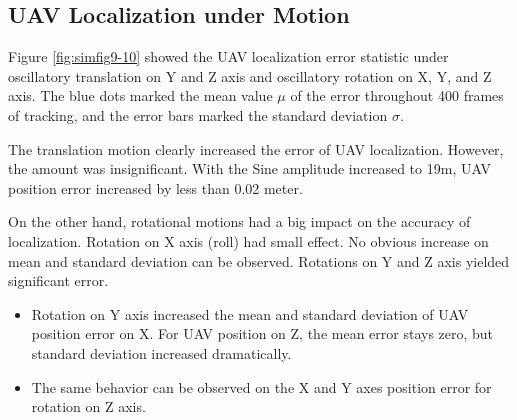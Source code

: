 \subsection{UAV Localization under Motion}\label{localization_motion}

Figure \ref{fig:simfig9-10} showed the UAV localization error
statistic under oscillatory translation on Y and Z axis and
oscillatory rotation on X, Y, and Z axis. The blue dots marked the mean
value $\mu$ of the error throughout 400 frames of tracking, and the
error bars marked the standard deviation $\sigma$.

The translation motion clearly increased the error of UAV
localization. However, the amount was insignificant. With the Sine
amplitude increased to 19m, UAV position error increased by less than
0.02 meter.

On the other hand, rotational motions had a big impact on the accuracy
of localization. Rotation on X axis (roll) had small effect. No
obvious increase on mean and standard deviation can be
observed. Rotations on Y and Z axis yielded significant error.

\begin{itemize}
  \item Rotation on Y axis increased the mean and standard deviation
  of UAV position error on X. For UAV position on Z, the mean
  error stays zero, but standard deviation increased dramatically.
  \item The same behavior can be observed on the X and Y axes position
  error for rotation on Z axis.
\end{itemize}

